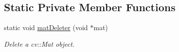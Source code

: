 \subsection*{Static Private Member Functions}
\begin{DoxyCompactItemize}
\item 
static void \hyperlink{classFrameConverter_a5a01cf7c8672bbc0f90c2d02d47a9a0c}{mat\+Deleter} (void $\ast$mat)\hypertarget{classFrameConverter_a5a01cf7c8672bbc0f90c2d02d47a9a0c}{}\label{classFrameConverter_a5a01cf7c8672bbc0f90c2d02d47a9a0c}

\begin{DoxyCompactList}\small\item\em Delete a cv\+::\+Mat object. \end{DoxyCompactList}\end{DoxyCompactItemize}
